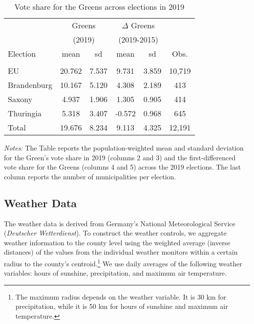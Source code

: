 \begin{table}[ht]\centering
	\begin{threeparttable}
		\caption{Vote share for the Greens across elections in 2019}
		\label{tab_greta_cons:data_greens_vote_share}
		\begin{tabular*}{.7\linewidth}{@{\extracolsep{\fill}}l*{5}{c}}
			\toprule
			
			&\multicolumn{2}{c}{Greens}&\multicolumn{2}{c}{$\Delta$ Greens}\\
			&\multicolumn{2}{c}{(2019)}&\multicolumn{2}{c}{(2019-2015)}\\
			\cmidrule(lr){2-3}\cmidrule(lr){4-5}
			Election		&	mean		&	sd		&	mean	& sd	&	Obs.	\\
			\midrule\\
			
			EU				&	20.762		&	7.537	&	9.731	& 3.859	&	10,719	\\
			Brandenburg		&	10.167		&	5.120	&	4.308	& 2.189	&	413		\\
			Saxony			&	4.937		&	1.906	&	1.305	& 0.905	&	414		\\
			Thuringia		&	5.318		&	3.407	&	-0.572	& 0.968	&	645		\\  
			\midrule
			Total			&	19.676		&	8.234	&	9.113	& 4.325	&	12,191	\\
			\bottomrule
		\end{tabular*}
		\begin{tablenotes} 
			\item \scriptsize \emph{Notes:} The Table reports the population-weighted mean and standard deviation for the Green's vote share in 2019 (columns 2 and 3) and the first-differenced vote share for the Greens (columns 4 and 5) across the 2019 elections. The last column reports the number of municipalities per election. 
		\end{tablenotes} 
	\end{threeparttable}
\end{table}







\subsection{Weather Data}
The weather data is derived from Germany's National Meteorological Service (\textit{Deutscher Wetterdienst}). To construct the weather controls, we aggregate weather information to the county level using the weighted average (inverse distances) of the values from the individual weather monitors within a certain radius to the county's centroid.\footnote{The maximum radius depends on the weather variable. It is 30 km for precipitation, while it is 50 km for hours of sunshine and maximum air temperature.} We use daily averages of the following weather variables: hours of sunshine, precipitation, and maximum air temperature.   



